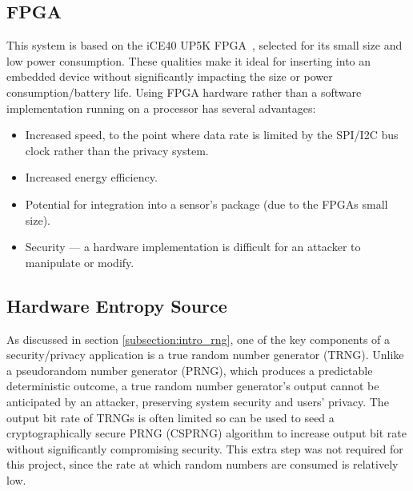 \documentclass[12pt]{article}
\begin{document}
    \subsection{FPGA}
      This system is based on the iCE40 UP5K FPGA~\cite{iCE40}, selected for its small size and low power consumption. These qualities make it ideal for inserting into an embedded device without significantly impacting the size or power consumption/battery life. Using FPGA hardware rather than a software implementation running on a processor has several advantages:

      \begin{itemize}
        \item Increased speed, to the point where data rate is limited by the SPI/I2C bus clock rather than the privacy system.
        \item Increased energy efficiency.
        \item Potential for integration into a sensor's package (due to the FPGAs small size).
        \item Security --- a hardware implementation is difficult for an attacker to manipulate or modify.
      \end{itemize}

    \subsection{Hardware Entropy Source} \label{subsection:hardware_entropy_source}
      As discussed in section \ref{subsection:intro_rng}, one of the key components of a security/privacy application is a true random number generator (TRNG). Unlike a pseudorandom number generator (PRNG), which produces a predictable deterministic outcome, a true random number generator's output cannot be anticipated by an attacker, preserving system security and users' privacy. The output bit rate of TRNGs is often limited so can be used to seed a cryptographically secure PRNG (CSPRNG) algorithm to increase output bit rate without significantly compromising security. This extra step was not required for this project, since the rate at which random numbers are consumed is relatively low.\\
\end{document}
